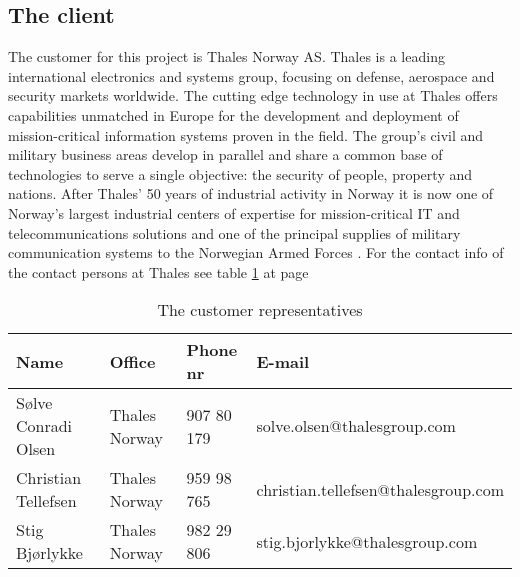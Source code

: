 \subsection{The client}
The customer for this project is Thales Norway AS. Thales is a leading international electronics and systems group, focusing on defense, aerospace and security markets worldwide. The cutting edge technology in use at Thales offers capabilities unmatched in Europe for the development and deployment of mission-critical information systems proven in the field. The group’s civil and military business areas develop in parallel and share a common base of technologies to serve a single objective: the security of people, property and nations.
\newline
\newline
After Thales’ 50 years of industrial activity in Norway it is now one of Norway’s largest industrial centers of expertise for mission-critical IT and telecommunications solutions and one of the principal supplies of military communication systems to the Norwegian Armed Forces \cite{bib:thales}.
\newline
\newline
For the contact info of the contact persons at Thales see table \ref{tab:customer} at page \pageref{tab:customer}
\begin{table}
\begin{tabular}{l|l|l|l}
\hline
\textbf{Name} & \textbf{Office} & \textbf{Phone nr} & \textbf{E-mail} \\ \hline \hline
Sølve Conradi Olsen & Thales Norway & 907 80 179 & solve.olsen@thalesgroup.com \\ 
Christian Tellefsen & Thales Norway & 959 98 765 & christian.tellefsen@thalesgroup.com \\ 
Stig Bjørlykke & Thales Norway & 982 29 806 & stig.bjorlykke@thalesgroup.com \\ \hline
\end{tabular}
\caption{The customer representatives} \label{tab:customer}
\end{table}

